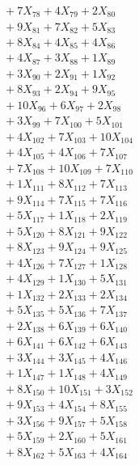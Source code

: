 \documentclass[a4paper,10pt]{article}
\begin{document}
{\begin{align}
&\;  + 7 X_{78} + 4 X_{79} + 2 X_{80} \\[0.3ex]
&\;  + 9 X_{81} + 7 X_{82} + 5 X_{83} \\[0.3ex]
&\;  + 8 X_{84} + 4 X_{85} + 4 X_{86} \\[0.3ex]
&\;  + 4 X_{87} + 3 X_{88} + 1 X_{89} \\[0.3ex]
&\;  + 3 X_{90} + 2 X_{91} + 1 X_{92} \\[0.3ex]
&\;  + 8 X_{93} + 2 X_{94} + 9 X_{95} \\[0.3ex]
&\;  + 10 X_{96} + 6 X_{97} + 2 X_{98} \\[0.3ex]
&\;  + 3 X_{99} + 7 X_{100} + 5 X_{101} \\[0.3ex]
&\;  + 4 X_{102} + 7 X_{103} + 10 X_{104} \\[0.3ex]
&\;  + 4 X_{105} + 4 X_{106} + 7 X_{107} \\[0.5ex]\allowbreak
&\;  + 7 X_{108} + 10 X_{109} + 7 X_{110} \\[0.3ex]
&\;  + 1 X_{111} + 8 X_{112} + 7 X_{113} \\[0.3ex]
&\;  + 9 X_{114} + 7 X_{115} + 7 X_{116} \\[0.3ex]
&\;  + 5 X_{117} + 1 X_{118} + 2 X_{119} \\[0.3ex]
&\;  + 5 X_{120} + 8 X_{121} + 9 X_{122} \\[0.3ex]
&\;  + 8 X_{123} + 9 X_{124} + 9 X_{125} \\[0.3ex]
&\;  + 4 X_{126} + 7 X_{127} + 1 X_{128} \\[0.3ex]
&\;  + 4 X_{129} + 1 X_{130} + 5 X_{131} \\[0.3ex]
&\;  + 1 X_{132} + 2 X_{133} + 2 X_{134} \\[0.3ex]
&\;  + 5 X_{135} + 5 X_{136} + 7 X_{137} \\[0.5ex]\allowbreak
&\;  + 2 X_{138} + 6 X_{139} + 6 X_{140} \\[0.3ex]
&\;  + 6 X_{141} + 6 X_{142} + 6 X_{143} \\[0.3ex]
&\;  + 3 X_{144} + 3 X_{145} + 4 X_{146} \\[0.3ex]
&\;  + 1 X_{147} + 1 X_{148} + 4 X_{149} \\[0.3ex]
&\;  + 8 X_{150} + 10 X_{151} + 3 X_{152} \\[0.3ex]
&\;  + 9 X_{153} + 4 X_{154} + 8 X_{155} \\[0.3ex]
&\;  + 3 X_{156} + 9 X_{157} + 5 X_{158} \\[0.3ex]
&\;  + 5 X_{159} + 2 X_{160} + 5 X_{161} \\[0.3ex]
&\;  + 8 X_{162} + 5 X_{163} + 4 X_{164} \\[0.3ex]

\end{align}}
\end{document}
